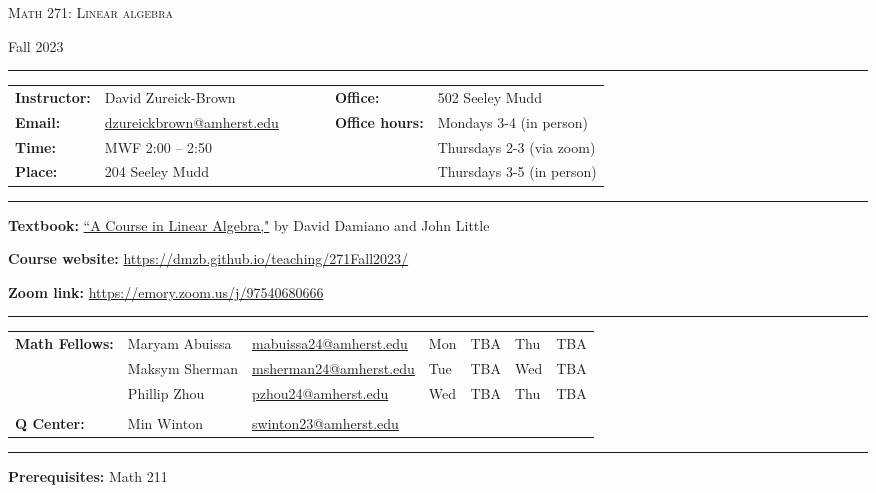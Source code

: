 \documentclass[12pt]{article}
\begin{document}
\begin{center}
{\Large \textsc{Math 271: Linear algebra}}
\end{center}
\begin{center}
Fall 2023
\end{center}



\hrule
\smallskip
\noindent \begin{tabular}{@{}llcccll}
\textbf{Instructor:}     & David Zureick-Brown & & &  & \textbf{Office:} & 502 Seeley Mudd \\
  \textbf{Email:}        &  \href{mailto: dzureickbrown@amherst.edu}{dzureickbrown@amherst.edu} & & & &  \textbf{Office hours:} & Mondays 3-4 (in person)\\
  \textbf{Time:}        &  MWF 2:00 -- 2:50  & & & &  &Thursdays 2-3 (via zoom) \\
  \textbf{Place:}        &  204 Seeley Mudd & & & &  & Thursdays 3-5 (in person)
\end{tabular}
\smallskip
\hrule


\medskip
\noindent\textbf{Textbook:}
\href{https://www.amazon.com/Course-Linear-Algebra-Dover-Mathematics/dp/0486469085}
{``A Course in Linear Algebra,"}  by David Damiano and John Little
\medskip

\noindent\textbf{Course website:} \url{https://dmzb.github.io/teaching/271Fall2023/}
\medskip

\noindent\textbf{Zoom link:} \url{https://emory.zoom.us/j/97540680666}
\medskip


\hrule
\smallskip

\noindent \begin{tabular}{@{}lllllll}

\textbf{Math Fellows:}      & Maryam Abuissa & \href{mailto: mabuissa24@amherst.edu}{mabuissa24@amherst.edu}  & Mon &TBA & Thu &TBA    \\
       &  Maksym Sherman &  \href{mailto: msherman24@amherst.edu}{msherman24@amherst.edu} & Tue & TBA & Wed & TBA \\
&  Phillip Zhou  & \href{mailto: pzhou24@amherst.edu}{pzhou24@amherst.edu} & Wed &TBA & Thu & TBA \\
                            &    & & & &  &\\            
\textbf{Q Center:}&  Min Winton  & \href{mailto: swinton23@amherst.edu}{swinton23@amherst.edu} & & &  &
\end{tabular}
\smallskip

\hrule
\medskip
\noindent\textbf{Prerequisites:} Math 211
\medskip
\end{document}
